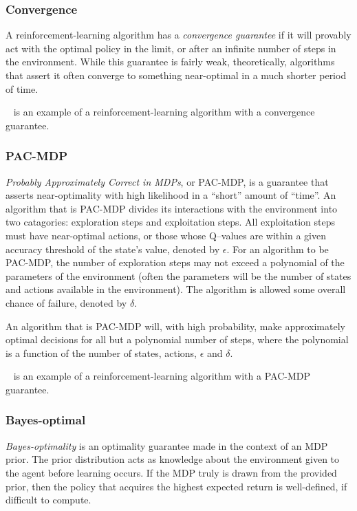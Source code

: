 \subsubsection{Convergence}

A reinforcement-learning algorithm has a \emph{convergence guarantee} if it will provably act with the optimal policy in the limit, or after an infinite number of steps in the environment. While this guarantee is fairly weak, theoretically, algorithms that assert it often converge to something near-optimal in a much shorter period of time.

~\cite{Watkins92} is an example of a reinforcement-learning algorithm with a convergence guarantee.

\subsubsection{PAC-MDP}

\emph{Probably Approximately Correct in MDPs}, or PAC-MDP, is a guarantee that asserts near-optimality with high likelihood in a ``short'' amount of ``time''. An algorithm that is PAC-MDP divides its interactions with the environment into two catagories: exploration steps and exploitation steps. All exploitation steps must have near-optimal actions, or those whose Q--values are within a given accuracy threshold of the state's value, denoted by $\epsilon$. For an algorithm to be PAC-MDP, the number of exploration steps may not exceed a polynomial of the parameters of the environment (often the parameters will be the number of states and actions available in the environment). The algorithm is allowed some overall chance of failure, denoted by $\delta$.

An algorithm that is PAC-MDP will, with high probability, make approximately optimal decisions for all but a polynomial number of steps, where the polynomial is a function of the number of states, actions, $\epsilon$ and $\delta$.

~\cite{brafman02} is an example of a reinforcement-learning algorithm with a PAC-MDP guarantee.

\subsubsection{Bayes-optimal}

\emph{Bayes-optimality} is an optimality guarantee made in the context of an MDP prior. The prior distribution acts as knowledge about the environment given to the agent before learning occurs. If the MDP truly is drawn from the provided prior, then the policy that acquires the highest expected return is well-defined, if difficult to compute.

